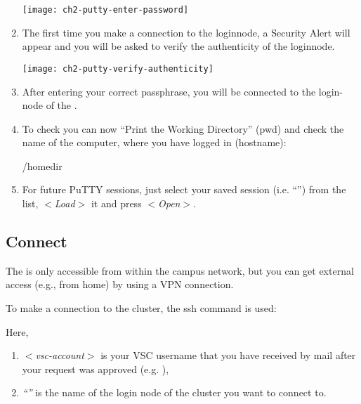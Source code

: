 \begin{enumerate}
  \texttt{[image: ch2-putty-enter-password]}

    \item  The first time you make a connection to the loginnode, a Security
      Alert will appear and you will be asked to verify the authenticity of the
      loginnode.

  \texttt{[image: ch2-putty-verify-authenticity]}

    \item  After entering your correct passphrase, you will be connected to the
      login-node of the \hpc.
    \item  To check you can now ``Print the Working Directory'' (pwd) and check
      the name of the computer, where you have logged in (hostname):

  \begin{prompt}
  /homedir
  \loginhost
  \end{prompt}

    \item  For future PuTTY sessions, just select your saved session (i.e.
      ``\emph{\hpcname}'') from the list, $<$\emph{Load}$>$ it and press
      $<$\emph{Open}$>$.
  \end{enumerate}

\fi

\subsection{Connect}
\label{sec:connect}

The \hpc is only accessible from within the \university campus network, but you can
get external access (e.g., from home) by using a VPN connection.

To make a connection to the \hpc cluster, the ssh command is used:

\begin{prompt}
\end{prompt}

Here,

\begin{enumerate}
  \item  \emph{$<$vsc-account$>$} is your VSC username that you have received
    by mail after your request was approved (e.g. \userid),
  \item  \emph{``\loginnode''} is the name of the login
    node of the \hpc cluster you want to connect to.
\end{enumerate}

